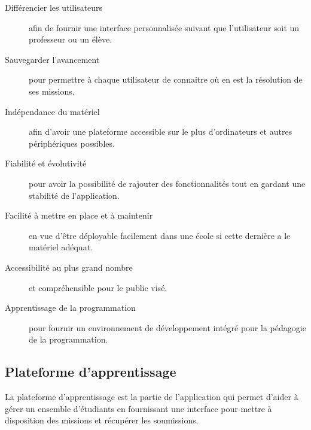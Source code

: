\begin{description}
  \item[Différencier les utilisateurs] afin de fournir une interface personnalisée suivant que l'utilisateur soit un professeur ou un élève.
  \item[Sauvegarder l'avancement] pour permettre à chaque utilisateur de connaitre où en est la résolution de ses missions.
  \item[Indépendance du matériel] afin d'avoir une plateforme accessible sur le plus d'ordinateurs et autres périphériques possibles.
  \item[Fiabilité et évolutivité] pour avoir la possibilité de rajouter des fonctionnalités tout en gardant une stabilité de l'application.
  \item[Facilité à mettre en place et à maintenir] en vue d'être déployable facilement dans une école si cette dernière a le matériel adéquat.
  \item[Accessibilité au plus grand nombre] et compréhensible pour le public visé.
  \item[Apprentissage de la programmation] pour fournir un environnement de développement intégré pour la pédagogie de la programmation.
\end{description}

\subsection{Plateforme d'apprentissage}
La plateforme d'apprentissage est la partie de l'application qui permet d'aider à gérer un ensemble d'étudiants en fournissant une interface pour mettre à disposition des missions et récupérer les soumissions.

